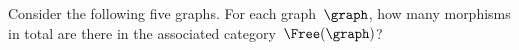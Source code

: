 \begin{gradedexercise}
	\label{ex:HowManyMorphisms}
	Consider the following five graphs.
	For each graph~$\graph$, how many morphisms in total are there in the associated category~$\Free(\graph)$?
	\begin{center}
	\end{center}
\end{gradedexercise}
